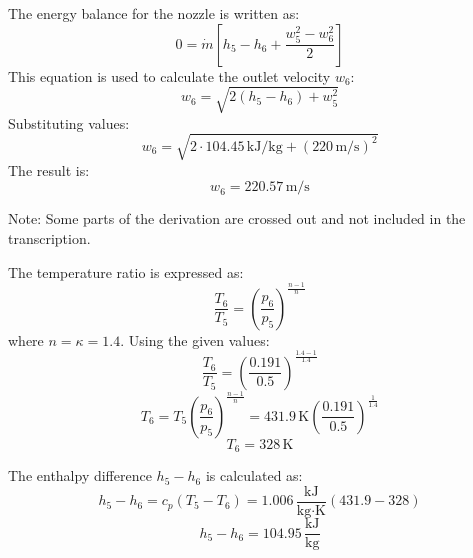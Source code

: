 The energy balance for the nozzle is written as:  
\[
0 = \dot{m} \left[ h_5 - h_6 + \frac{w_5^2 - w_6^2}{2} \right]
\]  
This equation is used to calculate the outlet velocity \( w_6 \):  
\[
w_6 = \sqrt{2 \left( h_5 - h_6 \right) + w_5^2}
\]  
Substituting values:  
\[
w_6 = \sqrt{2 \cdot 104.45 \, \text{kJ/kg} + (220 \, \text{m/s})^2}
\]  
The result is:  
\[
w_6 = 220.57 \, \text{m/s}
\]  

Note: Some parts of the derivation are crossed out and not included in the transcription.

The temperature ratio is expressed as:  
\[
\frac{T_6}{T_5} = \left( \frac{p_6}{p_5} \right)^{\frac{n-1}{n}}
\]  
where \( n = \kappa = 1.4 \).  
Using the given values:  
\[
\frac{T_6}{T_5} = \left( \frac{0.191}{0.5} \right)^{\frac{1.4 - 1}{1.4}}
\]  
\[
T_6 = T_5 \left( \frac{p_6}{p_5} \right)^{\frac{n-1}{n}} = 431.9 \, \text{K} \left( \frac{0.191}{0.5} \right)^{\frac{1}{1.4}}
\]  
\[
T_6 = 328 \, \text{K}
\]  

The enthalpy difference \( h_5 - h_6 \) is calculated as:  
\[
h_5 - h_6 = c_p \left( T_5 - T_6 \right) = 1.006 \, \frac{\text{kJ}}{\text{kg·K}} \left( 431.9 - 328 \right)
\]  
\[
h_5 - h_6 = 104.95 \, \frac{\text{kJ}}{\text{kg}}
\]